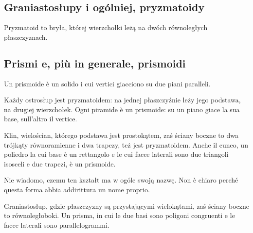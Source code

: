 
%


\subsection{Graniastosłupy i ogólniej, pryzmatoidy} %
Pryzmatoid to bryła, której wierzchołki leżą na dwóch równoległych płaszczyznach. %
\subsection{Prismi e, più in generale, prismoidi} %
Un prismoide è un solido i cui vertici giacciono su due piani paralleli. %

\begin{example}
[ostrosłup] %
[piramide] %
    Każdy ostrosłup jest pryzmatoidem: na jednej płaszczyźnie leży jego podstawa, na drugiej wierzchołek. %
    Ogni piramide è un prismoide: su un piano giace la sua base, sull'altro il vertice. %
\end{example}

\begin{example}
[klin] %
[cuneo] %
    Klin, wielościan, którego podstawa jest prostokątem, zaś ściany boczne to dwa trójkąty równoramienne i dwa trapezy, też jest pryzmatoidem. %
    Anche il cuneo, un poliedro la cui base è un rettangolo e le cui facce laterali sono due triangoli isosceli e due trapezi, è un prismoide. %
\end{example}

Nie wiadomo, czemu ten kształt ma w ogóle swoją nazwę. %
Non è chiaro perché questa forma abbia addirittura un nome proprio. %

\begin{example}
[graniastosłup] %
[prisma] %
    Graniastosłup, gdzie płaszczyzny są przystającymi wielokątami, zaś ściany boczne to równoległoboki. %
    Un prisma, in cui le due basi sono poligoni congruenti e le facce laterali sono parallelogrammi. %
\end{example}

